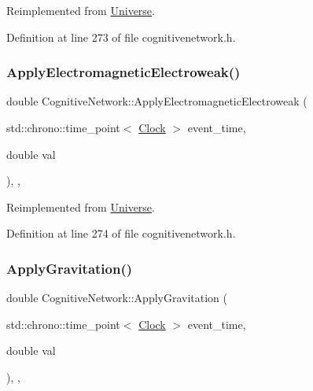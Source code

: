 Reimplemented from \hyperlink{class_universe_a1f787da78fa196ba635db21a9e91dabb}{Universe}.



Definition at line 273 of file cognitivenetwork.\+h.

\mbox{\label{class_cognitive_network_a9753f52c9e36ad44e9fac1d3e38a0770}} 
\subsubsection{\texorpdfstring{Apply\+Electromagnetic\+Electroweak()}{ApplyElectromagneticElectroweak()}}
{\footnotesize\ttfamily double Cognitive\+Network\+::\+Apply\+Electromagnetic\+Electroweak (\begin{DoxyParamCaption}\item[{std\+::chrono\+::time\+\_\+point$<$ \hyperlink{universe_8h_a0ef8d951d1ca5ab3cfaf7ab4c7a6fd80}{Clock} $>$}]{event\+\_\+time,  }\item[{double}]{val }\end{DoxyParamCaption})\hspace{0.3cm}{\ttfamily [inline]}, {\ttfamily [final]}, {\ttfamily [virtual]}}



Reimplemented from \hyperlink{class_universe_a4c36c1ab30db993307f88363dde5e8c5}{Universe}.



Definition at line 274 of file cognitivenetwork.\+h.

\mbox{\label{class_cognitive_network_a7d3252977440a9a5c004f748647ce885}} 
\subsubsection{\texorpdfstring{Apply\+Gravitation()}{ApplyGravitation()}}
{\footnotesize\ttfamily double Cognitive\+Network\+::\+Apply\+Gravitation (\begin{DoxyParamCaption}\item[{std\+::chrono\+::time\+\_\+point$<$ \hyperlink{universe_8h_a0ef8d951d1ca5ab3cfaf7ab4c7a6fd80}{Clock} $>$}]{event\+\_\+time,  }\item[{double}]{val }\end{DoxyParamCaption})\hspace{0.3cm}{\ttfamily [inline]}, {\ttfamily [final]}, {\ttfamily [virtual]}}



